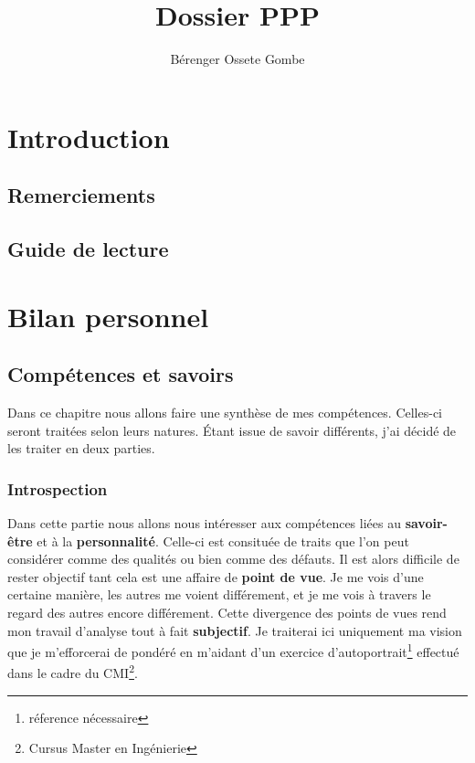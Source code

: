 \documentclass[a4paper,12pt, draft]{report}
\author{Bérenger Ossete Gombe}
\title{Dossier PPP}
\newcommand{\sommaire}{\shorttoc{Sommaire}{1}}
\begin{document}
\maketitle

\newpage
\sommaire{}

\newpage

\part{Introduction}

\chapter{Remerciements}

\chapter{Guide de lecture}

\part{Bilan personnel}

\chapter{Compétences et savoirs} 

Dans ce chapitre nous allons faire une synthèse de mes compétences.
Celles-ci seront traitées selon leurs natures.
Étant issue de savoir différents, j'ai décidé de les traiter en deux parties.


\section{Introspection}
Dans cette partie nous allons nous intéresser aux compétences liées au \textbf{savoir-être} et à la \textbf{personnalité}. Celle-ci est consituée de traits que l'on peut considérer comme des qualités ou bien comme des défauts. Il est alors difficile de rester objectif tant cela est une affaire de \textbf{point de vue}. Je me vois d'une certaine manière, les autres me voient différement, et je me vois à travers le regard des autres encore différement. Cette divergence des points de vues rend mon travail d'analyse tout à fait \textbf{subjectif}. Je traiterai ici uniquement ma vision que je m'efforcerai de pondéré en m'aidant d'un exercice d'autoportrait\footnote{réference nécessaire} effectué dans le cadre du CMI\footnote{Cursus Master en Ingénierie}.
\end{document}
